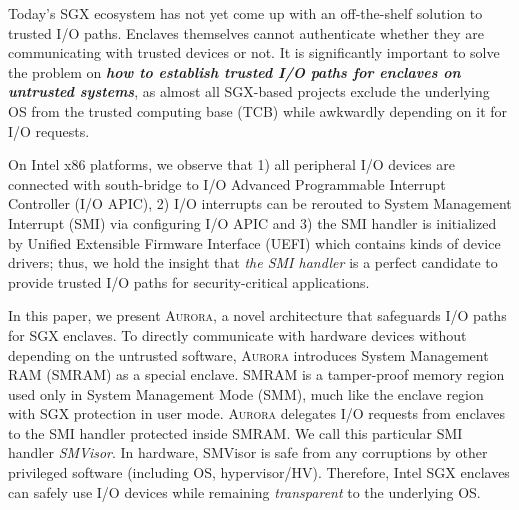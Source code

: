Today's SGX ecosystem has not yet come up with an off-the-shelf solution to trusted I/O paths. Enclaves themselves cannot authenticate whether they are communicating with trusted devices or not. 
It is significantly important to solve the problem on \textbf{\emph{how to establish trusted I/O paths for enclaves on untrusted systems}}, as almost all SGX-based projects exclude the underlying OS from the trusted computing base (TCB) while awkwardly depending on it for I/O requests. %

On Intel x86 platforms, we observe that 1) all peripheral I/O devices are connected with south-bridge to I/O Advanced Programmable Interrupt Controller (I/O APIC), 2) I/O interrupts can be rerouted to System Management Interrupt (SMI) via configuring I/O APIC and 3) the SMI handler is initialized by Unified Extensible Firmware Interface (UEFI) which contains kinds of device drivers; thus, we hold the insight that \textit{the SMI handler} is a perfect candidate to provide trusted I/O paths for security-critical applications.

In this paper, we present \textsc{Aurora}, a novel architecture that safeguards I/O paths for SGX enclaves. To directly communicate with hardware devices without depending on the untrusted software, \textsc{Aurora} introduces System Management RAM (SMRAM) as a special enclave. SMRAM is a tamper-proof memory region used only in System Management Mode (SMM), much like the enclave region with SGX protection in user mode. \textsc{Aurora} delegates I/O requests from enclaves to the SMI handler protected inside SMRAM. We call this particular SMI handler \textit{SMVisor}. In hardware, SMVisor is safe from any corruptions by other privileged software (including OS, hypervisor/HV). Therefore, Intel SGX enclaves can safely use I/O devices while remaining  \textit{transparent} to the underlying OS. %

